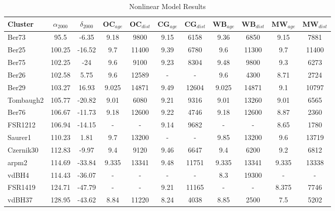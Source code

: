 \documentclass[draft]{aa}
\begin{document}
\begin{table*}
\caption{Nonlinear Model Results}             %
\label{table:1}      %
\centering                          %
\begin{tabular}{lcccccccccc}        %
\hline\hline                 %
Cluster & $\alpha_{2000}$  & $\delta_{2000}$ & OC$_{age}$ & OC$_{dist}$ & CG$_{age}$ &
CG$_{dist}$ & WB$_{age}$ & WB$_{dist}$ & MW$_{age}$ & MW$_{dist}$ \\
\hline                        %
Ber73        & 95.5   & -6.35     & 9.18  & 9800  & 9.15  & 6158  & 9.36  & 6850  & 9.15  & 7881  \\
Ber25        & 100.25 & -16.52    & 9.7   & 11400 & 9.39  & 6780  & 9.6   & 11300 & 9.7   & 11400 \\
Ber75        & 102.25 & -24       & 9.6   & 9100  & 9.23  & 8304  & 9.48  & 9800  & 9.3   & 6273  \\
Ber26        & 102.58 & 5.75      & 9.6   & 12589 & -   & -   & 9.6   & 4300  & 8.71  & 2724  \\
Ber29        & 103.27 & 16.93     & 9.025 & 14871 & 9.49  & 12604 & 9.025 & 14871 & 9.1   & 10797 \\
Tombaugh2    & 105.77 & -20.82    & 9.01  & 6080  & 9.21  & 9316  & 9.01  & 13260 & 9.01  & 6565  \\
Ber76        & 106.67 & -11.73    & 9.18  & 12600 & 9.22  & 4746  & 9.18  & 12600 & 8.87  & 2360  \\
FSR1212      & 106.94 & -14.15    & -   & -   & 9.14  & 9682  & -   & -   & 8.65  & 1780  \\
Saurer1      & 110.23 & 1.81      & 9.7   & 13200 & -   & -   & 9.85  & 13200 & 9.6   & 13719 \\
Czernik30    & 112.83 & -9.97     & 9.4   & 9120  & 9.46  & 6647  & 9.4   & 6200  & 9.2   & 6812  \\
arpm2        & 114.69 & -33.84    & 9.335 & 13341 & 9.48  & 11751 & 9.335 & 13341 & 9.335 & 13338 \\
vdBH4        & 114.43 & -36.07    & -   & -   & -   & -   & 8.3   & 19300 & -   & -   \\
FSR1419      & 124.71 & -47.79    & -   & -   & 9.21  & 11165 & -   & -   & 8.375 & 7746  \\
vdBH37       & 128.95 & -43.62    & 8.84  & 11220 & 8.24  & 4038  & 8.85  & 2500  & 7.5   & 5202  \\

\end{tabular}
\end{table*}
\end{document}
